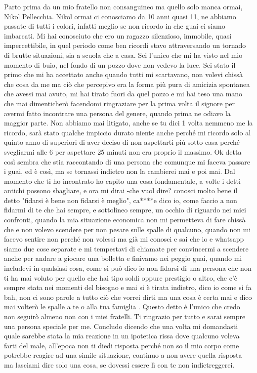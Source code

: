 Parto prima da un mio fratello non consanguineo ma quello solo manca ormai, Nikol Pellecchia.
Nikol ormai ci conosciamo da 10 anni quasi 11, ne abbiamo passate di tutti i colori, infatti meglio se non ricordo in che guai ci siamo imbarcati. Mi hai conosciuto che ero un ragazzo silenzioso, immobile, quasi impercettibile, in quel periodo come ben ricordi stavo attraversando un tornado di brutte situazioni, sia a scuola che a casa. Sei l'unico che mi ha visto nel mio momento di buio, nel fondo di un pozzo dove non vedevo la luce. Sei stato il primo che mi ha accettato anche quando tutti mi scartavano, non volevi chissà che cosa da me ma ciò che percepivo era la forma più pura di amicizia spontanea che avessi mai avuto, mi hai tirato fuori da quel pozzo e mi hai teso una mano che mai dimenticherò facendomi ringraziare per la prima volta il signore per avermi fatto incontrare una persona del genere, quando prima ne odiavo la maggior parte. Non abbiamo mai litigato, anche se tu dici 1 volta nemmeno me la ricordo, sarà stato qualche impiccio durato niente anche perché mi ricordo solo al quinto anno di superiori di aver deciso di non aspettarti più sotto casa perché svegliarmi alle 6 per aspettare 25 minuti non era proprio il massimo. Ok detta così sembra che stia raccontando di una persona che comunque mi faceva passare i guai, ed è così, ma se tornassi indietro non la cambierei mai e poi mai. Dal momento che ti ho incontrato ho capito una cosa fondamentale, a volte i detti antichi possono sbagliare, e ora mi dirai -che vuol dire? conosci molto bene il detto "fidarsi è bene non fidarsi è meglio", ca****e dico io, come faccio a non fidarmi di te che hai sempre, e sottolineo sempre, un occhio di riguardo nei miei confronti, quando la mia situazione economica non mi permetteva di fare chissà che e non volevo scendere per non pesare sulle spalle di qualcuno, quando non mi facevo sentire non perché non volessi ma già mi conosci e sai che io e whatsapp siamo due cose separate e mi tempestavi di chiamate per convincermi a scendere anche per andare a giocare una bolletta e finivamo nei peggio guai, quando mi includevi in qualsiasi cosa, come si può dico io non fidarsi di una persona che non ti ha mai voluto per quello che hai tipo soldi oppure prestigio o altro, che c'è sempre stata nei momenti del bisogno e mai si è tirata indietro, dico io come si fa bah, non ci sono parole a tutto ciò che vorrei dirti ma una cosa è certa mai e dico mai volterò le spalle a te o alla tua famiglia
. Questo detto è l'unico che credo non seguirò almeno non con i miei fratelli. Ti ringrazio per tutto e sarai sempre una persona speciale per me. Concludo dicendo che una volta mi domandasti quale sarebbe stata la mia reazione in un ipotetica rissa dove qualcuno voleva farti del male, all'epoca non ti diedi risposta perché non so il mio corpo come potrebbe reagire ad una simile situazione, continuo a non avere quella risposta ma lasciami dire solo una cosa, se dovessi essere lì con te non indietreggerei.\\

